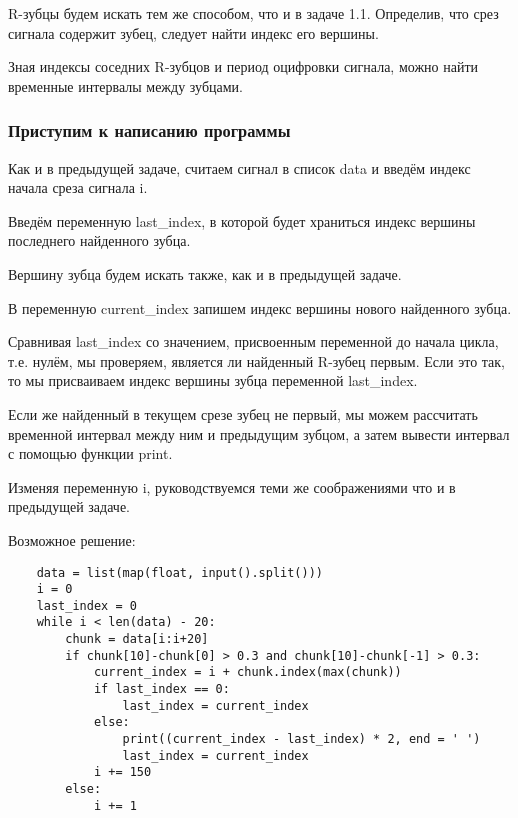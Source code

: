 \solutionSection

R-зубцы будем искать тем же способом, что и в задаче 1.1. Определив, что срез сигнала содержит зубец, следует найти индекс его вершины.

Зная индексы соседних R-зубцов и период оцифровки сигнала, можно найти временные интервалы между зубцами.


\subsubsection*{Приступим к написанию программы}

Как и в предыдущей задаче, считаем сигнал в список data и введём индекс начала среза сигнала i.

Введём переменную last\_index, в которой будет храниться индекс вершины последнего найденного зубца.

Вершину зубца будем искать также, как и в предыдущей задаче.

В переменную current\_index запишем индекс вершины нового найденного зубца.

Сравнивая last\_index со значением, присвоенным переменной до начала цикла, т.е. нулём, мы проверяем, является ли найденный R-зубец первым. Если это так, то мы присваиваем индекс вершины зубца переменной last\_index.

Если же найденный в текущем срезе зубец не первый, мы можем рассчитать временной интервал между ним и предыдущим зубцом, а затем вывести интервал с помощью функции print.

Изменяя переменную i, руководствуемся теми же соображениями что и в предыдущей задаче.

Возможное решение:

\begin{verbatim}
    data = list(map(float, input().split()))
    i = 0                    
    last_index = 0
    while i < len(data) - 20:
        chunk = data[i:i+20]
        if chunk[10]-chunk[0] > 0.3 and chunk[10]-chunk[-1] > 0.3:
            current_index = i + chunk.index(max(chunk)) 
            if last_index == 0:
                last_index = current_index
            else:
                print((current_index - last_index) * 2, end = ' ')
                last_index = current_index
            i += 150
        else:
            i += 1

\end{verbatim}
